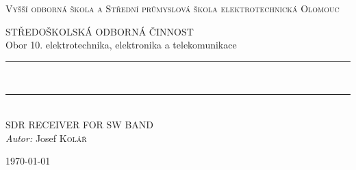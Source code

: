 \begin{titlepage}
  \begin{center}

  \textsc{\LARGE Vyšší odborná škola a Střední průmyslová škola elektrotechnická Olomouc}

  \begin{figure}[H]
    \centering
    
  \end{figure}

  \textsc{\Large STŘEDOŠKOLSKÁ ODBORNÁ ČINNOST}\\[0.5cm]
  Obor 10. elektrotechnika, elektronika a telekomunikace\\[.2cm]
	
  \rule{\linewidth}{0.5mm} \\[.4\linewidth]
  
  {
    \huge \bfseries \thetitle
  }

  \rule{\linewidth}{0.5mm} \\[.4\linewidth]
  
  SDR RECEIVER FOR SW BAND\\
		
  \emph{Autor:} Josef \textsc{Kolář}
  
  \vfill

  {\large \today}

  \end{center}
\end{titlepage}
